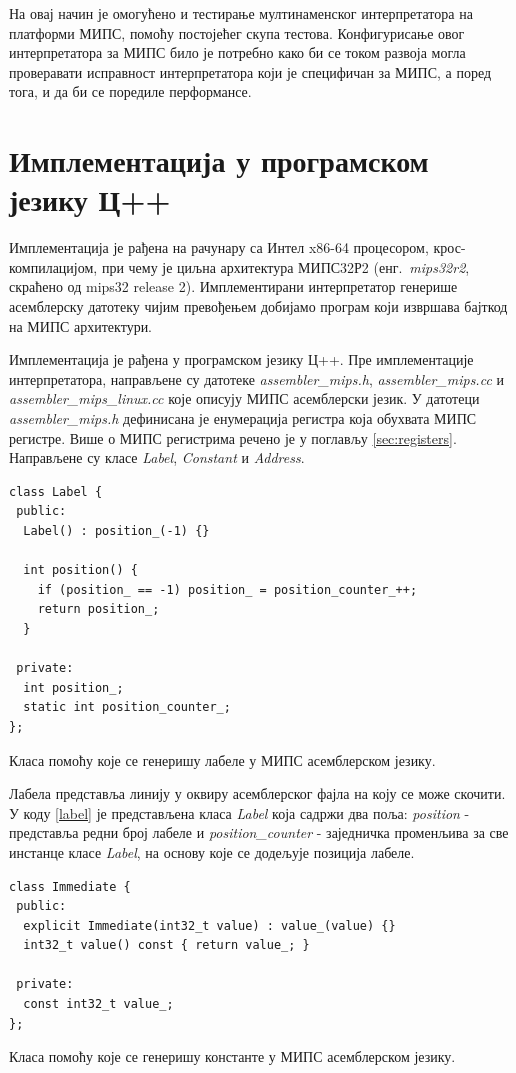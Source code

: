 \documentclass[12pt,oneside]{memoir}
\begin{document}
На овај начин је омогућено и тестирање мултинаменског интерпретатора на платформи МИПС, помоћу постојећег скупа тестова. Конфигурисање овог интерпретатора за МИПС било је потребно како би се током развоја могла проверавати исправност интерпретатора који је специфичан за МИПС, а поред тога, и да би се поредиле перформансе.

\section{Имплементација у програмском језику Ц++}
Имплементација је рађена на рачунару са Интел x86-64 процесором, крос-компилацијом, при чему је циљна архитектура  МИПС32Р2 (енг.~\textit{mips32r2}, скраћено од mips32 release 2). Имплементирани интерпретатор генерише асемблерску датотеку чијим превођењем добијамо програм који извршава бајткод на МИПС архитектури.

Имплементација је рађена у програмском језику Ц++. Пре имплементације интерпретатора, направљене су датотеке \textit{assembler\_mips.h},  \textit{assembler\_mips.cc} и \textit{assembler\_mips\_linux.cc} које описују МИПС асемблерски језик. У датотеци \textit{assembler\_mips.h} дефинисана је енумерација регистра која обухвата МИПС регистре. Више о МИПС регистрима речено је у поглављу \ref{sec:registers}. Направљене су класе \textit{Label}, \textit{Constant} и \textit{Address}. 

\begin{listing}
\begin{verbatim}
class Label {
 public:
  Label() : position_(-1) {}

  int position() {
    if (position_ == -1) position_ = position_counter_++;
    return position_;
  }

 private:
  int position_;
  static int position_counter_;
}; 
\end{verbatim}
\caption{Класа помоћу које се генеришу лабеле у МИПС асемблерском језику.}
\label{label}
\end{listing}

Лабела представља линију у оквиру асемблерског фајла на коју се може скочити. У коду \ref{label} је представљена класа \textit{Label} која садржи два поља: \textit{position} - представља редни број лабеле и \textit{position\_counter} - заједничка променљива за све инстанце класе \textit{Label}, на основу које се додељује позиција лабеле.\\

\begin{listing}
\begin{verbatim}
class Immediate {
 public:
  explicit Immediate(int32_t value) : value_(value) {}
  int32_t value() const { return value_; }

 private:
  const int32_t value_;
};
\end{verbatim}
\caption{Класа помоћу које се генеришу константе у МИПС асемблерском језику.}
\label{konstanta}
\end{listing}
\end{document}
